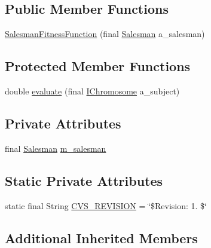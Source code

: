 \subsection*{Public Member Functions}
\begin{DoxyCompactItemize}
\item 
\hyperlink{classorg_1_1jgap_1_1impl_1_1salesman_1_1_salesman_fitness_function_a4feac82b08f718b0b15bf0414eb17246}{Salesman\-Fitness\-Function} (final \hyperlink{classorg_1_1jgap_1_1impl_1_1salesman_1_1_salesman}{Salesman} a\-\_\-salesman)
\end{DoxyCompactItemize}
\subsection*{Protected Member Functions}
\begin{DoxyCompactItemize}
\item 
double \hyperlink{classorg_1_1jgap_1_1impl_1_1salesman_1_1_salesman_fitness_function_a9ca825255dd4854bc0dc3b6ddcc0f339}{evaluate} (final \hyperlink{interfaceorg_1_1jgap_1_1_i_chromosome}{I\-Chromosome} a\-\_\-subject)
\end{DoxyCompactItemize}
\subsection*{Private Attributes}
\begin{DoxyCompactItemize}
\item 
final \hyperlink{classorg_1_1jgap_1_1impl_1_1salesman_1_1_salesman}{Salesman} \hyperlink{classorg_1_1jgap_1_1impl_1_1salesman_1_1_salesman_fitness_function_a3088a30ee6def3ac8460565b98af2f5b}{m\-\_\-salesman}
\end{DoxyCompactItemize}
\subsection*{Static Private Attributes}
\begin{DoxyCompactItemize}
\item 
static final String \hyperlink{classorg_1_1jgap_1_1impl_1_1salesman_1_1_salesman_fitness_function_a438943191a81a36319e2893b701cbc46}{C\-V\-S\-\_\-\-R\-E\-V\-I\-S\-I\-O\-N} = \char`\"{}\$Revision\-: 1. \$\char`\"{}
\end{DoxyCompactItemize}
\subsection*{Additional Inherited Members}



